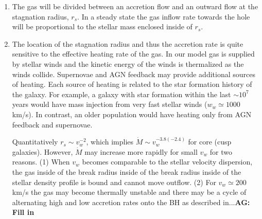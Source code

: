 \documentclass[usenatbib,fleqn]{mn2e}
\newcommand{\Mdot}{\dot{M}}
\newcommand{\rs}{r_s}
\begin{document}
  \begin{enumerate}
  \item The gas will be divided between an accretion flow and an
    outward flow at the stagnation radius, $\rs$. In a steady state
    the gas inflow rate towards the hole will be proportional to the
    stellar mass enclosed inside of $\rs$. 
  \item The location of the stagnation radius and thus the accretion
    rate is quite sensitive to the effective heating rate of the
    gas. In our model gas is supplied by stellar winds and the kinetic
    energy of the winds is thermalized as the winds
    collide. Supernovae and AGN feedback may provide additional
    sources of heating. Each source of heating is related to the star
    formation history of the galaxy.  For example, a galaxy with star
    formation within the last $\sim10^7$ years would have mass
    injection from very fast stellar winds ($w_w\simeq 1000$ km/s). In
    contrast, an older population would have heating only from AGN
    feedback and supernovae.
  
    Quantitatively $\rs\sim v_w^{-2}$, which implies $\Mdot\sim
    v_w^{-3.8 (-2.4)}$ for core (cusp galaxies). However, $\Mdot$ may
    increase more rapidly for small $v_w$ for two reasons. (1) When
    $v_w$ becomes comparable to the stellar velocity dispersion, the
    gas inside of the break radius inside of the break radius inside
    of the stellar density profile is bound and cannot move
    outflow. (2) For $v_w\simeq200 $ km/s the gas may become thermally
    unstable and there may be a cycle of alternating high and low
    accretion rates onto the BH as described in...{\bf AG: Fill in} 


\end{enumerate}
\end{document}
